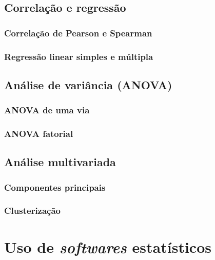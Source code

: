 \documentclass[
]{book}
\begin{document}
\section{Correlação e regressão}\label{correlauxe7uxe3o-e-regressuxe3o}

\subsection{Correlação de Pearson e Spearman}\label{correlauxe7uxe3o-de-pearson-e-spearman}

\subsection{Regressão linear simples e múltipla}\label{regressuxe3o-linear-simples-e-muxfaltipla}

\section{Análise de variância (ANOVA)}\label{anuxe1lise-de-variuxe2ncia-anova}

\subsection{ANOVA de uma via}\label{anova-de-uma-via}

\subsection{ANOVA fatorial}\label{anova-fatorial}

\section{Análise multivariada}\label{anuxe1lise-multivariada}

\subsection{Componentes principais}\label{componentes-principais}

\subsection{Clusterização}\label{clusterizauxe7uxe3o}

\chapter{\texorpdfstring{Uso de \emph{softwares} estatísticos}{Uso de softwares estatísticos}}\label{uso-de-softwares-estatuxedsticos}
\end{document}
